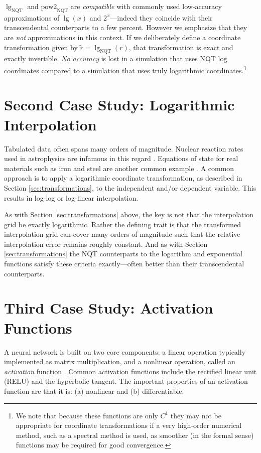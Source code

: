 \documentclass[a4paper,fleqn]{cas-sc}
\begin{document}
$\lg_{\text{NQT}}$ and $\text{pow2}_{\text{NQT}}$ are
\textit{compatible} with commonly used low-accuracy approximations of
$\lg(x)$ and $2^x$---indeed they coincide with their transcendental
counterparts to a few percent. However we emphasize that they are
\textit{not} approximations in this context. If we deliberately define
a coordinate transformation given by
$\tilde{r} = \lg_{\text{NQT}}(r)$, that transformation is exact and
exactly invertible. \textit{No accuracy} is lost
in a simulation that uses NQT log coordinates compared to a simulation
that uses truly logarithmic coordinates.\footnote{We note that because these
  functions are only $C^1$ they may not be appropriate for coordinate
  transformations if a very high-order numerical method, such as a
  spectral method is used, as smoother (in the formal sense) functions
  may be required for good convergence.}

\section{Second Case Study: Logarithmic Interpolation}
\label{sec:logarithmic:interpolation}

Tabulated data often spans many orders of magnitude. Nuclear reaction
rates used in astrophysics are infamous in this regard
\citep{Reaclib}. Equations of state for real materials such as iron and
steel are another common example \citep{Sesame}. A common approach is
to apply a logarithmic coordinate transformation, as described in
Section \ref{sec:transformations}, to the independent and/or dependent
variable. This results in log-log or log-linear interpolation.

As with Section \ref{sec:transformations} above, the key is not that
the interpolation grid be exactly logarithmic. Rather the defining
trait is that the transformed interpolation grid can cover many orders
of magnitude such that the relative interpolation error remains
roughly constant. And as with Section \ref{sec:transformations} the
NQT counterparts to the logarithm and exponential functions satisfy
these criteria exactly---often better than their transcendental
counterparts.

\section{Third Case Study: Activation Functions}
\label{sec:activation}

A neural network is built on two core components: a linear operation
typically implemented as matrix multiplication, and a nonlinear
operation, called an \textit{activation} function
\citep{goodfellow2016deep}. Common activation functions include the
rectified linear unit (RELU) and the hyperbolic tangent. The important
properties of an activation function are that it is: (a) nonlinear and
(b) differentiable.
\end{document}

